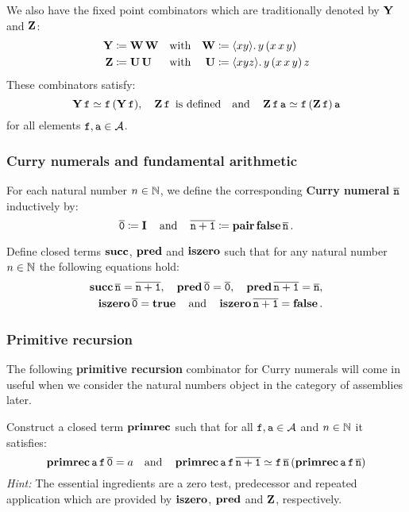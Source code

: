 We also have the fixed point combinators which are traditionally denoted by
\(\pcay\) and \(\pcaz\):
\begin{align*}
  \pcay &\coloneqq \pcaw\pcaw &\text{with}&& \pcaw &\coloneq \lambdapca{xy}{y\,(x\,x\,y)} \\
  \pcaz &\coloneqq \pcau\pcau &\text{with}&& \pcau &\coloneq \lambdapca{xyz}{y\,(x\,x\,y)\,z}
\end{align*}
These combinators satisfy:
\[
  \pcay\pca{f} \simeq \pca{f}{(\pcay\pca{f})},
    \quad
  \pcaz\pca{f} \text { is defined}
    \quad\text{and}\quad
  \pcaz\pca{f}\pca{a} \simeq \pca{f}{(\pcaz\pca{f})}\pca{a}
\]
for all elements \(\pca{f},\pca{a} \in \AA\).

\subsubsection*{Curry numerals and fundamental arithmetic}\label{sec:numerals}

For each natural number \(n \in \Nat\), we define the corresponding
\textbf{Curry numeral} \(\numeral{n}\) inductively by:
\[
  \numeral{0} \coloneq \icomb
  \quad\text{and}\quad
  \numeral{n+1} \coloneq \pcapair\pcafalse\numeral{n}.
\]

\begin{exercise}\label{exer:arithmetic}
  Define closed terms \(\pcasucc\), \(\pcapred\) and \(\pcaiszero\) such that
  for any natural number \(n \in \Nat\) the following equations hold:
  \begin{align*}
    \pcasucc\numeral{n} = \numeral{n+1},
    \quad
    \pcapred\numeral{0} = \numeral{0},
    \quad
    \pcapred\numeral{n+1} = \numeral{n}, \\
    \pcaiszero\numeral{0} = \pcatrue
    \quad\text{and}\quad
    \pcaiszero\numeral{n+1} = \pcafalse.
  \end{align*}

\end{exercise}

\subsubsection*{Primitive recursion}

The following \textbf{primitive recursion} combinator for Curry numerals will
come in useful when we consider the natural numbers object in the category of
assemblies later.

\begin{exercise}\label{exer:primitive-recursion}
  Construct a closed term \(\pcarec\) such that for all
  \(\pca{f},\pca{a} \in \AA\) and \(n \in \Nat\) it satisfies:
  \[
    \pcarec\pca{a}\pca{f}\numeral{0} = a
    \quad\text{and}\quad
    \pcarec\pca{a}\pca{f}\numeral{n+1} \simeq \pca{f}\numeral{n}{(\pcarec\pca{a}\pca{f}\numeral{n})}
  \]
  \emph{Hint:} The essential ingredients are a zero test, predecessor and
  repeated application which are provided by \(\pcaiszero\), \(\pcapred\) and
  \(\pcaz\), respectively.
\end{exercise}


